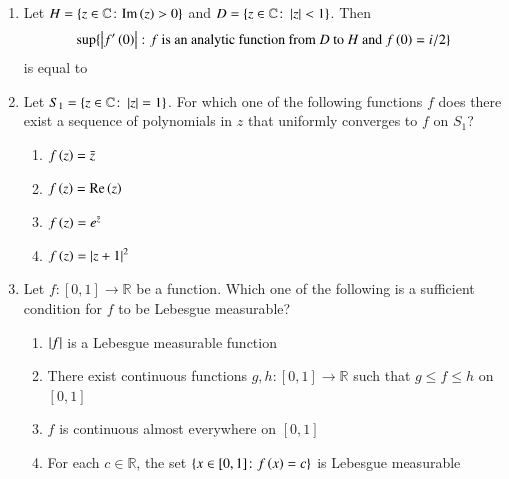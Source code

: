 \documentclass[journal,12pt,onecolumn]{IEEEtran}
\theoremstyle{remark}
\begin{document}
\begin{enumerate}
\item Let $H = \{z \in \mathbb{C} \colon \text{Im}\left(z\right) > 0\}$ and $D = \{z \in \mathbb{C} \colon \left\vert z\right\vert < 1\}$. Then
\[ \sup \{ \left\vert f'\left(0\right)\right\vert \colon f \text{ is an analytic function from } D \text{ to } H \text{ and } f\left(0\right) = i/2 \} \]
is equal to \hfill{}
\begin{enumerate}
\end{enumerate}

\item Let $S_1 = \{z \in \mathbb{C} \colon \left\vert z\right\vert = 1\}$. For which one of the following functions $f$ does there exist a sequence of polynomials in $z$ that uniformly converges to $f$ on $S_1$? \hfill{}
\begin{enumerate}
    \item $f\left(z\right) = \bar{z}$
    \item $f\left(z\right) = \text{Re}\left(z\right)$
    \item $f\left(z\right) = e^{\bar{z}}$
    \item $f\left(z\right) = \left\vert z+1\right\vert^2$
\end{enumerate}

\item Let $f \colon [0, 1] \to \mathbb{R}$ be a function. Which one of the following is a sufficient condition for $f$ to be Lebesgue measurable? \hfill{}
\begin{enumerate}
    \item $\left\vert f\right\vert$ is a Lebesgue measurable function
    \item There exist continuous functions $g, h \colon [0, 1] \to \mathbb{R}$ such that $g \le f \le h$ on $[0, 1]$
    \item $f$ is continuous almost everywhere on $[0, 1]$
    \item For each $c \in \mathbb{R}$, the set $\{x \in [0, 1] \colon f\left(x\right) = c\}$ is Lebesgue measurable
\end{enumerate}


\end{enumerate}
\end{document}
